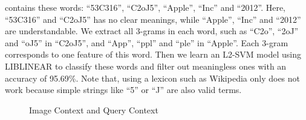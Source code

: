 \noindent
contains these words: ``53C316'', ``C2oJ5'', ``Apple'',
``Inc'' and ``2012''.
Here, ``53C316'' and ``C2oJ5'' has no clear meanings,
while ``Apple'', ``Inc'' and ``2012'' are understandable.
We extract all 3-grams in each word, such as
``C2o'', ``2oJ'' and ``oJ5'' in ``C2oJ5'',
and ``App'', ``ppl'' and ``ple'' in ``Apple''.
Each 3-gram corresponds to one feature of this word.
Then we learn an L2-SVM model using LIBLINEAR \cite{liblinear}
to classify these words and filter out meaningless ones with
an accuracy of 95.69\%.
Note that, using a lexicon such as Wikipedia only does not work
because simple strings like ``5'' or ``J''
are also valid terms.

\begin{figure}[th]
	\centerline{}
	\caption{Image Context and Query Context}
	\label{fig:context-bean}
\vspace*{-1mm}
\end{figure}



